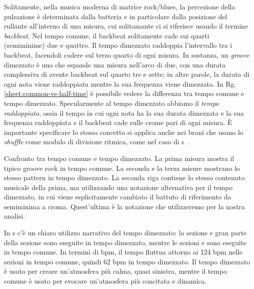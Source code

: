 \documentclass[class=book, crop=false, oneside, 12pt]{standalone}
\begin{document}
    Solitamente, nella musica moderna di matrice rock/blues, la percezione della pulsazione  è determinata dalla batteria e in particolare dalla posizione del rullante all'interno di una misura, cui solitamante ci si riferisce usando il termine \emph{backbeat}. Nel tempo comune, il backbeat solitamente cade  sui quarti (semiminime) due e quattro. Il tempo dimezzato raddoppia l'intervallo tra i backbeat, facendoli cadere sul terzo quarto di ogni misura. In sostanza, un \emph{groove} dimezzato è uno che espande una misura nell'arco di due, con una durata complessiva di  avente backbeat sul quarto tre e sette; in altre parole, la durata di ogni nota viene raddoppiata mentre la sua frequenza viene dimezzata. In Rg.\ref{sheet:common-vs-half-time} è possibile vedere la differenza tra tempo comune e tempo dimezzato. Specularmente al tempo dimezzato abbiamo il \emph{tempo raddoppiato}, ossia il tempo in cui ogni nota ha la sua durata dimezzata e la sua frequenza raddoppiata e il backbeat cade sulle crome pari di ogni misura. È importante specificare lo stesso concetto si applica anche nei brani che usano lo \emph{shuffle} come modulo di divisione ritmica, come nel caso di \acrshort{s}~\cite{randel2003harvard}.

    \begin{sheet}[htb]
        \centering
        \caption[Confronto tra tempo comune e tempo dimezzato.]{Confronto tra tempo comune e tempo dimezzato. La prima misura mostra il tipico groove rock in tempo comune. La seconda e la terza misure mostrano lo stesso pattern in tempo dimezzato. La seconda riga contiene lo stesso contenuto musicale della prima, ma utilizzando una notazione alternativa per il tempo dimezzato, in cui viene esplicitamente cambiato il battuto di riferimento da semiminima a croma. Quest'ultima è la notazione che utilizzeremo per la nostra analisi.}
        \label{sheet:common-vs-half-time}
    \end{sheet}

    In \acrshort{s} c'è un chiaro utilizzo narrativo del tempo dimezzato: la sezione  e gran parte della sezione  sono eseguite in tempo dimezzato, mentre le sezioni  e  sono eseguite in tempo comune. In termini di bpm, il tempo fluttua attorno ai 124 bpm nelle sezioni in tempo comune, quindi 62 bpm in tempo dimezzato. Il tempo dimezzato è usato per creare un'atmosfera più calma, quasi sinistra, mentre il tempo comune è usato per evocare un'atmosfera più concitata e dinamica.
\end{document}
